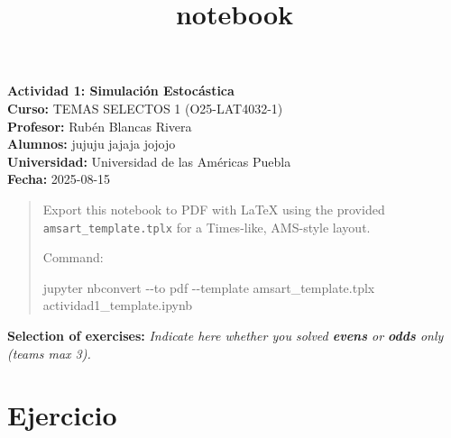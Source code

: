 \documentclass[11pt]{article}
\title{notebook}
\newenvironment{Shaded}{}{}
\newcommand{\NormalTok}[1]{{#1}}
\newcommand{\ExtensionTok}[1]{{#1}}
\newcommand{\AttributeTok}[1]{\textcolor[rgb]{0.49,0.56,0.16}{{#1}}}
\begin{document}
        
        

    \begin{titlepage}
    \centering

            \LARGE{\textbf{Actividad 1: Simulación
    Estocástica}}\\[0.5cm]

    \small
    \textbf{Curso:} TEMAS SELECTOS 1 (O25-LAT4032-1)\\

    \textbf{Profesor:} Rubén Blancas Rivera\\

    \textbf{Alumnos:} jujuju jajaja jojojo\\

    \textbf{Universidad:} Universidad de las Américas Puebla\\

    \textbf{Fecha:} 2025-08-15
        
    \restoregeometry
    \end{titlepage}
    \newpage




\begin{quote}
Export this notebook to PDF with LaTeX using the provided
\texttt{amsart\_template.tplx} for a Times-like, AMS-style layout.

Command:

\begin{Shaded}
\begin{Highlighting}[]
\ExtensionTok{jupyter}\NormalTok{ nbconvert }\AttributeTok{{-}{-}to}\NormalTok{ pdf }\AttributeTok{{-}{-}template}\NormalTok{ amsart\_template.tplx actividad1\_template.ipynb}
\end{Highlighting}
\end{Shaded}
\end{quote}

\textbf{Selection of exercises:} \emph{Indicate here whether you solved
\textbf{evens} or \textbf{odds} only (teams max 3).}

\newpage

    \hypertarget{ejercicio}{%
\section{Ejercicio}\label{ejercicio}}
\end{document}
